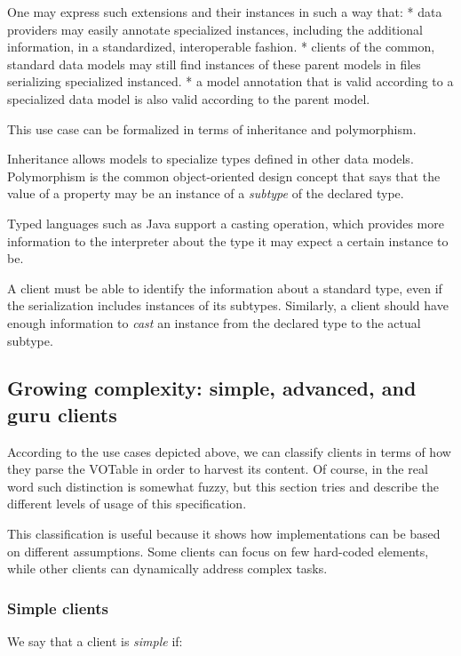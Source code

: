 \documentclass[11pt,a4paper]{ivoa}
\begin{document}
One may express such extensions and their instances in such a way that:
* data providers may easily annotate specialized instances, including
the additional information, in a standardized, interoperable fashion. *
clients of the common, standard data models may still find instances of
these parent models in files serializing specialized instanced. * a
model annotation that is valid according to a specialized data model is
also valid according to the parent model.

This use case can be formalized in terms of inheritance and
polymorphism.

Inheritance allows models to specialize types defined in other data
models. Polymorphism is the common object-oriented design concept that
says that the value of a property may be an instance of a \emph{subtype}
of the declared type.

Typed languages such as Java support a casting operation, which provides
more information to the interpreter about the type it may expect a
certain instance to be.

A client must be able to identify the information about a standard type,
even if the serialization includes instances of its subtypes. Similarly,
a client should have enough information to \emph{cast} an instance from
the declared type to the actual subtype.

\subsection{Growing complexity: simple, advanced, and guru
clients}\label{sec:clients}

According to the use cases depicted above, we can classify clients in
terms of how they parse the VOTable in order to harvest its content. Of
course, in the real word such distinction is somewhat fuzzy, but this
section tries and describe the different levels of usage of this
specification.

This classification is useful because it shows how implementations can
be based on different assumptions. Some clients can focus on few
hard-coded elements, while other clients can dynamically address complex
tasks.

\subsubsection{Simple clients}\label{simple-clients}

We say that a client is \emph{simple} if:
\end{document}
